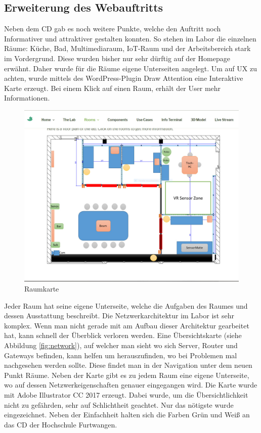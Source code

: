 \subsection{Erweiterung des Webauftritts}
Neben dem \acf{CD} gab es noch weitere Punkte, welche den Auftritt noch Informativer und attraktiver gestalten konnten. So stehen im Labor die einzelnen Räume: Küche, Bad, Multimediaraum, IoT-Raum und der Arbeitsbereich stark im Vordergrund. Diese wurden bisher nur sehr dürftig auf der Homepage erwähnt. Daher wurde für die Räume eigene Unterseiten angelegt. Um auf \acf{UX} zu achten, wurde mittels des WordPress-Plugin Draw Attention  eine Interaktive Karte erzeugt. Bei einem Klick auf einen Raum, erhält der User mehr Informationen. \autocite{WPDrawAttention.}

\begin{figure}[bh]
	\centering
	\includegraphics[scale=0.35]{content/pictures/room.jpg}
	\caption{Raumkarte}
	\label{fig:room}
\end{figure}

Jeder Raum hat seine eigene Unterseite, welche die Aufgaben des Raumes und dessen Ausstattung beschreibt.
\newpage
Die Netzwerkarchitektur im Labor ist sehr komplex. Wenn man nicht gerade mit am Aufbau dieser Architektur gearbeitet hat, kann schnell der Überblick verloren werden. Eine Übersichtskarte (siehe Abbildung \ref{fig:network}), auf welcher man sieht wo sich Server, Router und Gateways befinden, kann helfen um herauszufinden, wo bei Problemen mal nachgesehen werden sollte. Diese findet man in der Navigation unter dem neuen Punkt Räume. Neben der Karte gibt es zu jedem Raum eine eigene Unterseite, wo auf dessen Netzwerkeigenschaften genauer eingegangen wird. Die Karte wurde mit Adobe Illustrator CC 2017 erzeugt. Dabei wurde, um die Übersichtlichkeit nicht zu gefährden, sehr auf Schlichtheit geachtet. Nur das nötigste wurde eingezeichnet. Neben der Einfachheit halten sich die Farben Grün und Weiß an das \ac{CD} der Hochschule Furtwangen.

